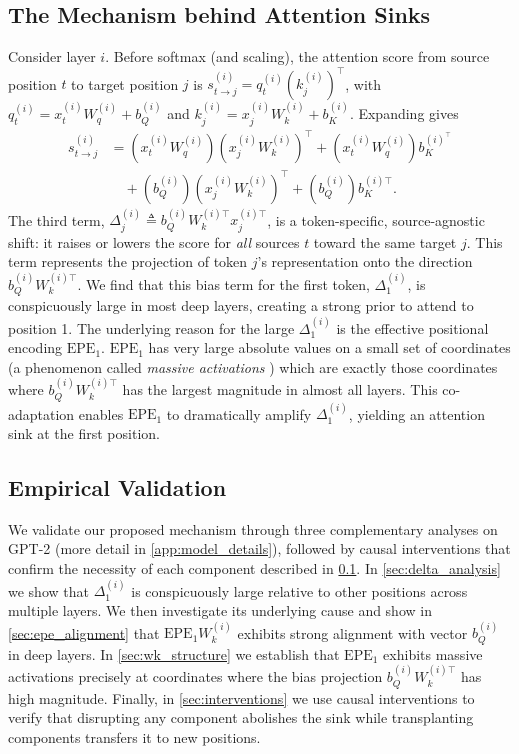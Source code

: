 \documentclass[11pt]{article}
\begin{document}
\subsection{The Mechanism behind Attention Sinks}\label{sec:mechanism}
Consider layer $i$. Before softmax (and scaling), the attention score from source position $t$ to target position $j$ is $s_{t\to j}^{(i)} = q_t^{(i)} (k_j^{(i)})^\top$, with $q_t^{(i)} = x_t^{(i)}W_q^{(i)} + b_Q^{(i)}$ and $k_j^{(i)} = x_j^{(i)}W_k^{(i)} + b_K^{(i)}$. Expanding gives
\[
\begin{aligned}
s_{t\to j}^{(i)} &= (x_t^{(i)}W_q^{(i)})(x_j^{(i)}W_k^{(i)})^\top  + (x_t^{(i)}W_q^{(i)}) b_K^{(i)^\top} \\
&\quad + (b_Q^{(i)})(x_j^{(i)}W_k^{(i)})^\top  + (b_Q^{(i)}) b_K^{(i)\top}.
\end{aligned}
\]
The third term, $\Delta_j^{(i)} \triangleq b_Q^{(i)}W_k^{(i)\top} x_j^{(i)\top}$, is a token-specific, source-agnostic shift: it raises or lowers the score for \emph{all} sources $t$ toward the same target $j$. This term represents the projection of token $j$'s representation onto the direction $b_Q^{(i)}W_k^{(i)\top}$. We find that this bias term for the first token, $\Delta_1^{(i)}$, is conspicuously large in most deep layers, creating a strong prior to attend to position 1. The underlying reason for the large $\Delta_1^{(i)}$ is the effective positional encoding $\mathrm{EPE}_1$. $\mathrm{EPE}_1$ has very large absolute values on a small set of coordinates (a phenomenon called \textit{massive activations} \cite{sun2024massive}) which are exactly those coordinates where $b_Q^{(i)}W_k^{(i)\top}$ has the largest magnitude in almost all layers. This co-adaptation enables $\mathrm{EPE}_1$ to dramatically amplify $\Delta_1^{(i)}$, yielding an attention sink at the first position. 

\subsection{Empirical Validation}
We validate our proposed mechanism through three complementary analyses on GPT-2 (more detail in \cref{app:model_details}), followed by causal interventions that confirm the necessity of each component described in \cref{sec:mechanism}. In \cref{sec:delta_analysis} we show that $\Delta_1^{(i)}$ is conspicuously large relative to other positions across multiple layers. We then investigate its underlying cause and show in \cref{sec:epe_alignment} that $\mathrm{EPE}_1W_k^{(i)}$ exhibits strong alignment with vector $b_Q^{(i)}$ in deep layers. In \cref{sec:wk_structure} we establish that $\mathrm{EPE}_1$ exhibits massive activations precisely at coordinates where the bias projection $b_Q^{(i)} W_k^{(i)\top}$ has high magnitude. Finally, in \cref{sec:interventions} we use causal interventions to verify that disrupting any component abolishes the sink while transplanting components transfers it to new positions.
\end{document}
